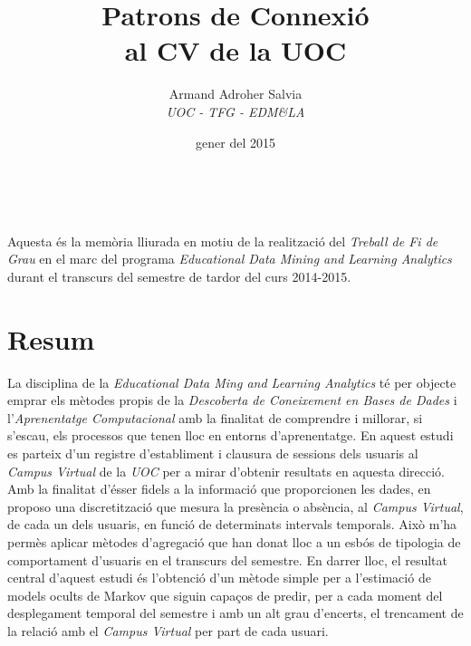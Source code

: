 \documentclass[
	a4paper,
	twoside,
	justified
]{tufte-book}
\title{Patrons de Connexió \\
				al CV de la UOC}
\date{gener del 2015}
\author{Armand Adroher Salvia\\
	{\it UOC - TFG - EDM\&LA}}
\begin{document}
\setcounter{tocdepth}{1}
  
\frontmatter{}

\maketitle

\newpage
\begin{fullwidth}
~\vfill
\thispagestyle{empty}
\setlength{\parindent}{0pt}
\setlength{\parskip}{\baselineskip}

\par Aquesta és la memòria lliurada en motiu de la realització del \emph{Treball de Fi de Grau} en el marc del programa \emph{Educational Data Mining and Learning Analytics} durant el transcurs del semestre de tardor del curs 2014-2015.  


\end{fullwidth}


\tableofcontents

\listoffigures

\listoftables

\cleardoublepage
\chapter*{Resum}

La disciplina de la \emph{Educational Data Ming and Learning Analytics} té per objecte emprar els mètodes propis de la \emph{Descoberta de Coneixement en Bases de Dades} i l'\emph{Aprenentatge Computacional} amb la finalitat de comprendre i millorar, si s'escau, els processos que tenen lloc en entorns d'aprenentatge. En aquest estudi es parteix d'un registre d'establiment i clausura de sessions dels usuaris al \emph{Campus Virtual} de la \emph{UOC} per a mirar d'obtenir resultats en aquesta direcció. Amb la finalitat d'ésser fidels a la informació que proporcionen les dades, en proposo una discretització que mesura la presència o absència, al \emph{Campus Virtual}, de cada un dels usuaris, en funció de determinats intervals temporals. Això m'ha permès aplicar mètodes d'agregació que han donat lloc a un esbós de tipologia de comportament d'usuaris en el transcurs del semestre. En darrer lloc, el resultat central d'aquest estudi és l'obtenció d'un mètode simple per a l'estimació de models ocults de Markov que siguin capaços de predir, per a cada moment del desplegament temporal del semestre i amb un alt grau d'encerts, el trencament de la relació amb el \emph{Campus Virtual} per part de cada usuari.           
\end{document}
